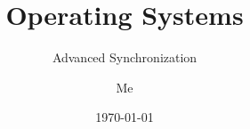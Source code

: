 \documentclass[12pt]{beamer}
\title{Operating Systems}
\subtitle{Advanced Synchronization}
\author{Me}
\date{\today}
\begin{document}
  \begin{frame}
    \titlepage
  \end{frame}

  
  
  
  

%    
\end{document}
